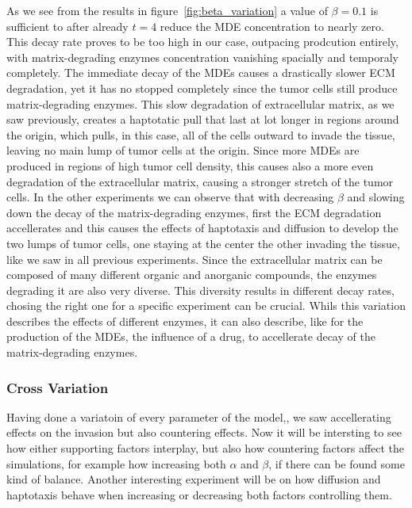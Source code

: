 As we see from the results in figure~\ref{fig:beta_variation} a value of $\beta=0.1$ is sufficient to after already $t=4$ reduce the MDE concentration to nearly zero. This decay rate proves to be too high in our case, outpacing prodcution entirely, with matrix-degrading enzymes concentration vanishing spacially and temporaly completely. The immediate decay of the MDEs causes a drastically slower ECM degradation, yet it has no stopped completely since the tumor cells still produce matrix-degrading enzymes. This slow degradation of extracellular matrix, as we saw previously, creates a haptotatic pull that last at lot longer in regions around the origin, which pulls, in this case, all of the cells outward to invade the tissue, leaving no main lump of tumor cells at the origin. Since more MDEs are produced in regions of high tumor cell density, this causes also a more even degradation of the extracellular matrix, causing a stronger stretch of the tumor cells.\newline
In the other experiments we can observe that with decreasing $\beta$ and slowing down the decay of the matrix-degrading enzymes, first the ECM degradation accellerates and this causes the effects of haptotaxis and diffusion to develop the two lumps of tumor cells, one staying at the center the other invading the tissue, like we saw in all previous experiments.\newline 
Since the extracellular matrix can be composed of many different organic and anorganic compounds, the enzymes degrading it are also very diverse. This diversity results in different decay rates, chosing the right one for a specific experiment can be crucial. Whils this variation describes the effects of different enzymes, it can also describe, like for the production of the MDEs, the influence of a drug, to accellerate decay of the matrix-degrading enzymes.

\subsubsection*{Cross Variation}
Having done a variatoin of every parameter of the model,, we saw accellerating effects on the invasion but also countering effects. Now it will be intersting to see how either supporting factors interplay, but also how countering factors affect the simulations, for example how increasing both $\alpha$ and $\beta$, if there can be found some kind of balance. Another interesting experiment will be on how diffusion and haptotaxis behave when increasing or decreasing both factors controlling them.

